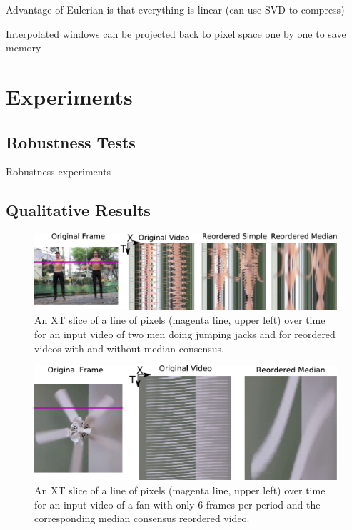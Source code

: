 \documentclass{article}
\begin{document}
Advantage of Eulerian is that everything is linear (can use SVD to compress)

Interpolated windows can be projected back to pixel space one by one to save memory


\section{Experiments}

\subsection{Robustness Tests}
Robustness experiments

\subsection{Qualitative Results}
\begin{figure}
\centering
\includegraphics[width=\columnwidth]{XTSliceJumpingJacks.pdf}
\caption{An XT slice of a line of pixels (magenta line, upper left) over time for an input video of two men doing jumping jacks and for reordered videos with and without median consensus.}
\label{fig:XTSliceJumpingJacks}
\end{figure}

\begin{figure}
\centering
\includegraphics[width=\columnwidth]{XTSliceFan.pdf}
\caption{An XT slice of a line of pixels (magenta line, upper left) over time for an input video of a fan with only 6 frames per period and the corresponding median consensus reordered video.}
\label{fig:XTSliceFan}
\end{figure}
\end{document}
